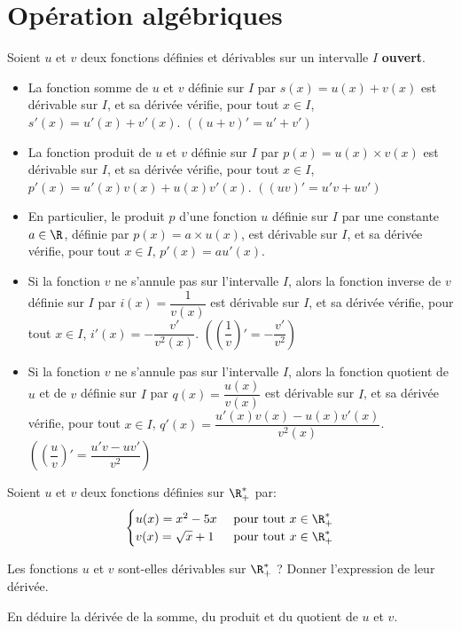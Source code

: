 \documentclass{article}
\begin{document}
\section{Opération algébriques}
\begin{tcolorbox}
\begin{proposition}
Soient $u$ et $v$ deux fonctions définies et dérivables sur un intervalle $I$ \textbf{ouvert}.
\begin{itemize}
\item La fonction somme de $u$ et $v$ définie sur $I$ par $s(x) = u(x) + v(x)$ est dérivable sur $I$, et sa dérivée vérifie, pour tout $x \in I$, $s'(x) = u'(x) + v'(x)$. $\left((u+v)' = u' + v'\right)$
\item La fonction produit de $u$ et $v$ définie sur $I$ par $p(x) = u(x) \times v(x)$ est dérivable sur $I$, et sa dérivée vérifie, pour tout $x \in I$, $p'(x) = u'(x)v(x) + u(x)v'(x)$. $\left((uv)' = u'v + uv'\right)$
\item En particulier, le produit $p$ d'une fonction $u$ définie sur $I$ par une constante $a \in \R$, définie par $p(x) = a \times u(x)$, est dérivable sur $I$, et sa dérivée vérifie, pour tout $x \in I$, $p'(x) = a u'(x)$.
\item Si la fonction $v$ ne s'annule pas sur l'intervalle $I$, alors la fonction inverse de $v$ définie sur $I$ par $i(x) = \dfrac{1}{v(x)}$ est dérivable sur $I$, et sa dérivée vérifie, pour tout $x \in I$, $i'(x) = -\dfrac{v'}{v^2(x)}$. $\left(\left(\dfrac{1}{v}\right)' = -\dfrac{v'}{v^2}\right)$
\item Si la fonction $v$ ne s'annule pas sur l'intervalle $I$, alors la fonction quotient de $u$ et de $v$ définie sur $I$ par $q(x) = \dfrac{u(x)}{v(x)}$ est dérivable sur $I$, et sa dérivée vérifie, pour tout $x \in I$, $q'(x) = \dfrac{u'(x)v(x) - u(x)v'(x)}{v^2(x)}$. $\left(\left(\dfrac{u}{v}\right)' = \dfrac{u'v - uv'}{v^2}\right)$
\end{itemize}
\end{proposition}
\end{tcolorbox}
\begin{example}
Soient $u$ et $v$ deux fonctions définies sur $\R_+^*$ par:
\begin{equation*}
\begin{cases}
u(x) = x^2 -5x& \text{ pour tout } x \in \R_+^*\\
v(x) = \sqrt{x} + 1& \text{ pour tout } x \in \R_+^*
\end{cases}
\end{equation*}
\begin{enumquestions}
\item Les fonctions $u$ et $v$ sont-elles dérivables sur $\R_+^*$ ? Donner l'expression de leur dérivée.

\vspace*{0.2cm}
\emptybox{6cm}
\item En déduire la dérivée de la somme, du produit et du quotient de $u$ et $v$.

\vspace*{0.2cm}
\emptybox{6cm}
\end{enumquestions}
\end{example}
\end{document}
